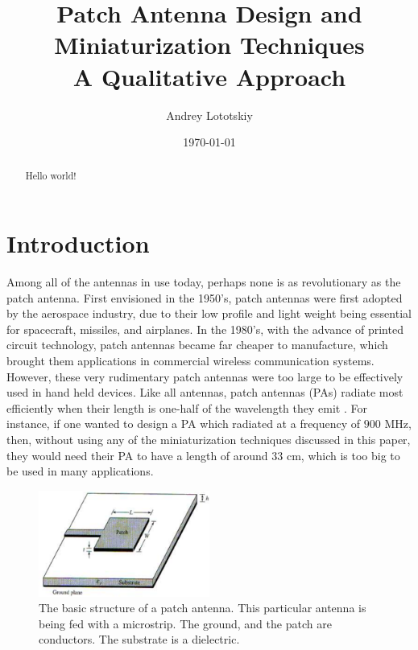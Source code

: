 \documentclass[12pt]{article}
\title{Patch Antenna Design and Miniaturization Techniques \\A Qualitative Approach}
\author{Andrey Lototskiy}
\date{\today}
\begin{document}
\maketitle

\begin{abstract}
Hello world!
\end{abstract}

\section{Introduction}
Among all of the antennas in use today, perhaps none is as revolutionary as the patch antenna. First envisioned in the 1950's\cite{gutton1955flat}, patch antennas were first adopted by the aerospace industry\cite{balanis2016antenna}, due to their low profile and light weight being essential for spacecraft, missiles, and airplanes. In the 1980's, with the advance of printed circuit technology, patch antennas became far cheaper to manufacture\cite{khan2015microstrip}, which brought them applications in commercial wireless communication systems. 
However, these very rudimentary patch antennas were too large to be effectively used in hand held devices. Like all antennas, patch antennas (PAs) radiate most efficiently when their length is one-half of the wavelength they emit \cite{khan2015microstrip}. For instance, if one wanted to design a PA which radiated at a frequency of $900$ MHz, then, without using any of the miniaturization techniques discussed in this paper, they would need their PA to have a length of around $33$ cm, which is too big to be used in many applications. 

\begin{figure}[h]
    \centering
    \includegraphics[width=0.5\textwidth]{patch-antenna-structure.png}
    \caption{The basic structure of a patch antenna. This particular antenna is being fed with a microstrip. The ground, and the patch are conductors. The substrate is a dielectric. \cite{girase2014design}}
\end{figure}
\end{document}
